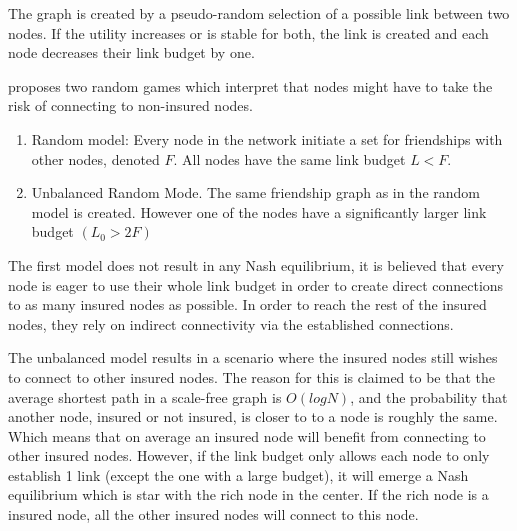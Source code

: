 The graph is created by a pseudo-random selection of a possible link between two nodes. If the utility increases or is stable for both, the link is created and each node decreases their link budget by one.

 
\cite{danezis2006network} proposes two random games which interpret that nodes might have to take the risk of connecting to non-insured nodes.
\begin{enumerate}
\item Random model: Every node in the network initiate a set for friendships with other nodes, denoted $F$. All nodes have the same link budget $L<F$. 
\item Unbalanced Random Mode. The same friendship graph as in the random model is created. However one of the nodes have a significantly larger link budget $(L_{0} > 2 F)$
\end{enumerate}

The first model does not result in any Nash equilibrium, it is believed that every node is eager to use their whole link budget in order to create direct connections to as many insured nodes as possible. In order to reach the rest of the insured nodes, they rely on indirect connectivity via the established connections.

The unbalanced model results in a scenario where the insured nodes still wishes to connect to other insured nodes. The reason for this is claimed to be that the average shortest path in a scale-free graph is $O(log N)$, and the probability that another node, insured or not insured, is closer to to a node is roughly the same. Which means that on average an insured node will benefit from connecting to other insured nodes. 
However, if the link budget only allows each node to only establish 1 link (except the one with a large budget), it will emerge a Nash equilibrium which is star with the rich node in the center. If the rich node is a insured node, all the other insured nodes will connect to this node. 






